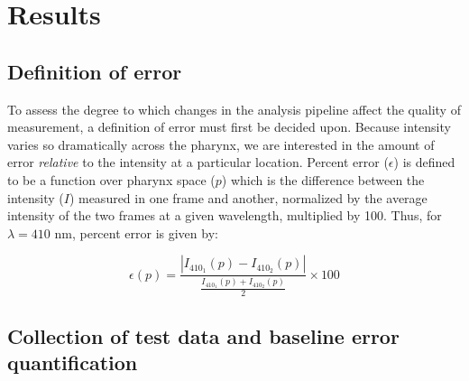 
\chapter{Results} %

\label{Chapter3} %

\section{Definition of error}
To assess the degree to which changes in the analysis pipeline affect the quality of measurement, a definition of error must first be decided upon. Because intensity varies so dramatically across the pharynx, we are interested in the amount of error \textit{relative} to the intensity at a particular location. Percent error ($\epsilon$) is defined to be a function over pharynx space ($p$) which is the difference between the intensity ($I$) measured in one frame and another, normalized by the average intensity of the two frames at a given wavelength, multiplied by 100. Thus, for $\lambda = 410\text{ nm}$, percent error is given by:

\[\epsilon(p) = \frac{|I_{410_1}(p) - I_{410_2}(p)|}{\frac{I_{410_1}(p) + I_{410_2}(p)}{2}} \times 100\]



\section{Collection of test data and baseline error quantification} \label{testCollection}

